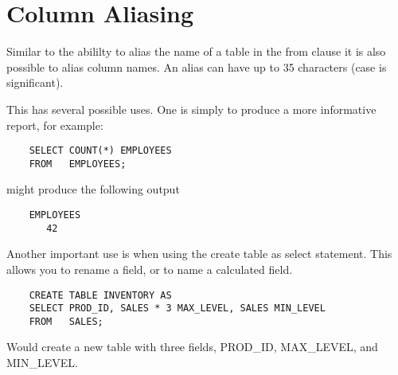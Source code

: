 \section{Column Aliasing}

Similar to the abililty to alias the name of a table in the from clause
it is also possible to alias column names.  An alias can have up to 35
characters (case is significant).

This has several possible uses.
One is simply to produce a more informative report, for example:

\begin{verbatim}
    SELECT COUNT(*) EMPLOYEES
    FROM   EMPLOYEES;
\end{verbatim}

might produce the following output

\begin{screen}
\begin{verbatim}
    EMPLOYEES
       42
\end{verbatim}
\end{screen}

Another important use is when using the create table as select statement.
This allows you to rename a field, or to name a calculated field.

\begin{verbatim}
    CREATE TABLE INVENTORY AS
    SELECT PROD_ID, SALES * 3 MAX_LEVEL, SALES MIN_LEVEL
    FROM   SALES;
\end{verbatim}

Would create a new table with three fields, PROD\_ID, MAX\_LEVEL,
and MIN\_LEVEL.
